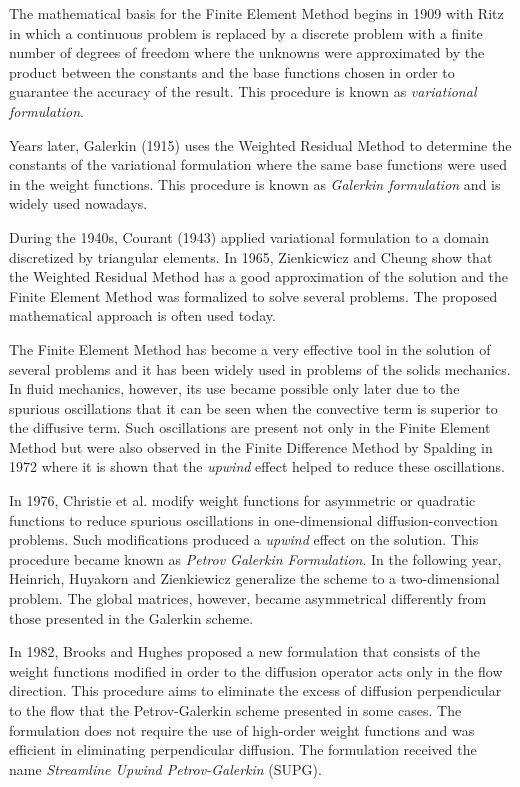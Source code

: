 The mathematical basis for the Finite Element Method begins in 1909
 with Ritz \cite{ritz1909} in which a continuous problem is replaced by 
a discrete problem with a finite number of degrees of freedom
 where the unknowns were approximated by the product between
 the constants and the base functions chosen
 in order to guarantee the accuracy of the result.
 This procedure is known as \textit{variational formulation}.

\medskip
 Years later, Galerkin (1915) \cite{galerkin1915} uses the Weighted Residual Method
 to determine the constants of the variational formulation
 where the same base functions were used in the weight functions.
 This procedure is known as \textit{Galerkin formulation} and
 is widely used nowadays.

\medskip
During the 1940s, Courant (1943) \cite{courant1943} applied
 variational formulation to a domain discretized by triangular elements.
 In 1965, Zienkicwicz and Cheung \cite{zienkiewicz1965}
 show that the Weighted Residual Method has a good approximation
 of the solution and the Finite Element Method was formalized
 to solve several problems. The proposed mathematical approach
 is often used today.

\medskip
The Finite Element Method has become a very effective tool
 in the solution of several problems and it has been widely
 used in problems of the solids mechanics.
 In fluid mechanics, however, its use became possible only
 later due to the spurious oscillations that it can be seen
 when the convective term is superior to the diffusive term.
 Such oscillations are present not only in the Finite Element Method
 but were also observed in the Finite Difference Method by
 Spalding in 1972 \cite{spalding1972} where it is shown that
 the \textit{upwind} effect helped to reduce these oscillations.

\medskip
In 1976, Christie et al. \cite{christie1976} modify weight
 functions for asymmetric or quadratic functions to reduce
 spurious oscillations in one-dimensional diffusion-convection problems.
 Such modifications produced a \textit{upwind} effect on the solution.
 This procedure became known as \textit{Petrov Galerkin Formulation}.
 In the following year, Heinrich, Huyakorn and Zienkiewicz
 \cite{heinrich1977} generalize the scheme to a two-dimensional problem.
 The global matrices, however, became asymmetrical differently
 from those presented in the Galerkin scheme.

\medskip
In 1982, Brooks and Hughes \cite{brooks1982} proposed a
 new formulation that consists of the weight functions modified
 in order to the diffusion operator acts only in the flow direction.
 This procedure aims to eliminate the excess of
 diffusion perpendicular to the flow that
 the Petrov-Galerkin scheme presented in some cases.
 The formulation does not require the use of high-order
 weight functions and was efficient in eliminating perpendicular
 diffusion. The formulation received the name
 \textit{Streamline Upwind Petrov-Galerkin} (SUPG).


